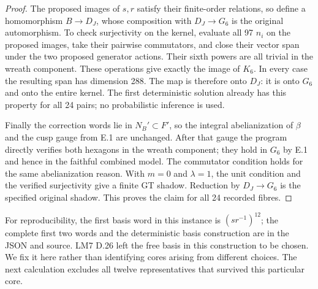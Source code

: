 \begin{proof}
The proposed images of $s,r$ satisfy their finite-order relations,
so define a homomorphism $B\to D_J$, whose composition with
$D_J\to G_6$ is the original automorphism. To check surjectivity
on the kernel, evaluate all 97 $n_i$ on the proposed images, take
their pairwise commutators, and close their vector span under the
two proposed generator actions. Their sixth powers are all trivial
in the wreath component. These operations give exactly the image
of $K_6$. In every case the resulting span has dimension 288.
The map is therefore onto $D_J$: it is onto $G_6$ and onto the
entire kernel. The first deterministic solution already has this
property for all 24 pairs; no probabilistic inference is used.

Finally the correction words lie in $N_B'\subset F'$, so the
integral abelianization of $\beta$ and the cusp gauge from E.1 are
unchanged. After that gauge the program directly verifies both
hexagons in the wreath component; they hold in $G_6$ by E.1 and
hence in the faithful combined model. The commutator condition
holds for the same abelianization reason. With $m=0$ and
$\lambda=1$, the unit condition and the verified surjectivity give
a finite GT shadow. Reduction by $D_J\to G_6$ is the specified
original shadow. This proves the claim for all 24 recorded fibres.
\end{proof}

For reproducibility, the first basis word in this instance is
$(sr^{-1})^{12}$; the complete first two words and the deterministic
basis construction are in the JSON and source. LM7 D.26 left the
free basis in this construction to be chosen. We fix it here rather
than identifying cores arising from different choices. The next
calculation excludes all twelve representatives that survived this
particular core.


